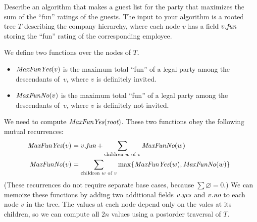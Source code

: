 \documentclass[11pt]{article}
\begin{document}
\begin{enumerate}
Describe an algorithm that makes a guest list for the party that maximizes the sum of the “fun” ratings of the guests.  The input to your algorithm is a rooted tree $T$ describing the company hierarchy, where each node $v$ has a field $v.\emph{fun}$ storing the “fun” rating of the corresponding employee.

\begin{solution}
We define two functions over the nodes of $T$.
\begin{itemize}
\item 
$\emph{MaxFunYes}(v)$ is the maximum total “fun” of a legal party among the descendants of~$v$, where $v$ is definitely invited.
\item 
$\emph{MaxFunNo}(v)$ is the maximum total “fun” of a legal party among the descendants of~$v$, where $v$ is definitely not invited.
\end{itemize}
We need to compute $\emph{MaxFunYes}(\emph{root})$.  These two functions obey the following mutual recurrences:
\begin{align*}
	\emph{MaxFunYes}(v)
	&=
	v.\emph{fun}
	+
	\sum_{\text{children $w$ of $v$}} \emph{MaxFunNo}(w)
\\
	\emph{MaxFunNo}(v)
	&=
	\sum_{\text{children $w$ of $v$}} \max\{ \emph{MaxFunYes}(w), \emph{MaxFunNo}(w) \}
\end{align*}
(These recurrences do not require separate base cases, because $\sum\varnothing = 0$.)  We can memoize these functions by adding two additional fields $v.\emph{yes}$ and $v.\emph{no}$ to each node $v$ in the tree.  The values at each node depend only on the vales at its children, so we can compute all $2n$ values using a postorder traversal of $T$.


\end{solution}
\end{enumerate}
\end{document}
